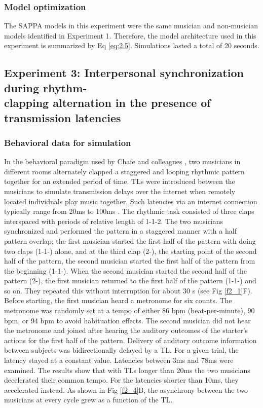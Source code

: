 \documentclass{report}
\begin{document}
\subsubsection{Model optimization}

The SAPPA models in this experiment were the same musician and non-musician models identified in Experiment 1. Therefore, the model architecture used in this experiment is summarized by Eq \eqref{eq:2.5}. Simulations lasted a total of 20 seconds.

\subsection{Experiment 3: Interpersonal synchronization during rhythm-\\ clapping alternation in the presence of transmission latencies}

\subsubsection{Behavioral data for simulation}

In the behavioral paradigm used by Chafe and colleagues \cite{chafe2010effect}, two musicians in different rooms alternately clapped a staggered and looping rhythmic pattern together for an extended period of time. TLs were introduced between the musicians to simulate transmission delays over the internet when remotely located individuals play music together. Such latencies via an internet connection typically range from 20ms to 100ms \cite{caceres2010jacktrip, caceres2008edge}. The rhythmic task consisted of three claps interspaced with periods of relative length of 1-1-2. The two musicians synchronized and performed the pattern in a staggered manner with a half pattern overlap; the first musician started the first half of the pattern with doing two claps (1-1-) alone, and at the third clap (2-), the starting point of the second half of the pattern, the second musician started the first half of the pattern from the beginning (1-1-). When the second musician started the second half of the pattern (2-), the first musician returned to the first half of the pattern (1-1-) and so on. They repeated this without interruption for about 30 s (see Fig \ref{f2_1}F). Before starting, the first musician heard a metronome for six counts. The metronome was randomly set at a tempo of either 86 bpm (beat-per-minute), 90 bpm, or 94 bpm to avoid habituation effects. The second musician did not hear the metronome and joined after hearing the auditory outcomes of the starter's actions for the first half of the pattern. Delivery of auditory outcome information between subjects was bidirectionally delayed by a TL. For a given trial, the latency stayed at a constant value. Latencies between 3ms and 78ms were examined. The results show that with TLs longer than 20ms the two musicians decelerated their common tempo. For the latencies shorter than 10ms, they accelerated instead. As shown in Fig \ref{f2_4}B, the asynchrony between the two musicians at every cycle grew as a function of the TL.
\end{document}
